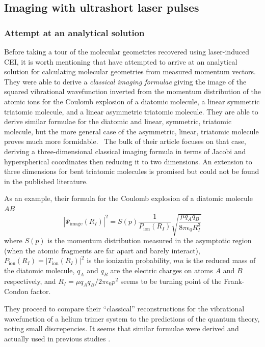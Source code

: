 \subsection{Imaging with ultrashort laser pulses}\label{sec:laserCEI}

\subsubsection*{Attempt at an analytical solution}
Before taking a tour of the molecular geometries recovered using laser-induced CEI, it is worth mentioning that \citet{Nagaya04} have attempted to arrive at an analytical solution for calculating molecular geometries from measured momentum vectors. They were able to derive a \emph{classical imaging formulae} giving the image of the squared vibrational wavefunction inverted from the momentum distribution of the atomic ions for the Coulomb explosion of a diatomic molecule, a linear symmetric triatomic molecule, and a linear asymmetric triatomic molecule. They are able to derive similar formulae for the diatomic and linear, symmetric, triatomic molecule, but the more general case of the asymmetric, linear, triatomic molecule proves much more formidable.\footnotemark~ The bulk of their article focuses on that case, deriving a three-dimensional classical imaging formula in terms of Jacobi and hyperspherical coordinates then reducing it to two dimensions. An extension to three dimensions for bent triatomic molecules is promised but could not be found in the published literature.

As an example, their formula for the Coulomb explosion of a diatomic molecule $AB$
\begin{equation}
|\Psi_\mathrm{image}(R_I)|^2 = S(p) \frac{1}{P_\mathrm{ion}(R_I)} \sqrt{\frac{\mu q_A q_B}{8\pi\epsilon_0 R_I^3}}
\end{equation}
where $S(p)$ is the momentum distribution measured in the asymptotic region (when the atomic fragments are far apart and barely interact), $P_\mathrm{ion}(R_I) = |T_\mathrm{ion}(R_I)|^2$ is the ionizatin probability, $mu$ is the reduced mass of the diatomic molecule, $q_A$ and $q_B$ are the electric charges on atoms $A$ and $B$ respectively, and $R_I = \mu q_A q_B/2\pi\epsilon_0 p^2$ seems to be turning point of the Frank-Condon factor.

They proceed to compare their ``classical'' reconstructions for the vibrational wavefunction of a helium trimer system to the predictions of the quantum theory, noting small discrepencies. It seems that similar formulae were derived and actually used in previous studies \citep{Bandrauk01,Chelkowski02}.

